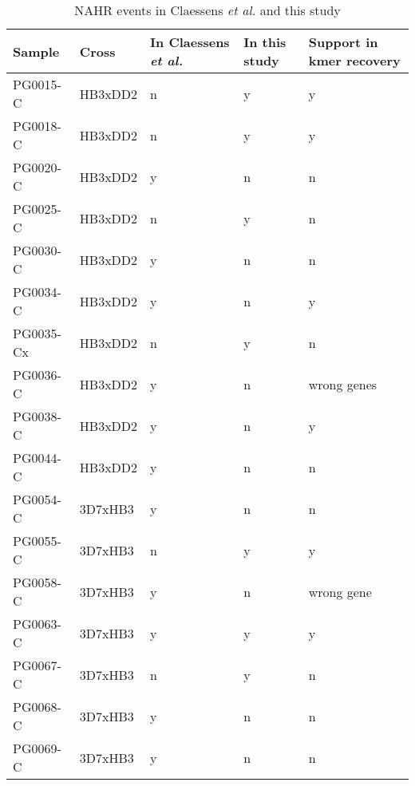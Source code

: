 \begin{table}[]
\centering
\caption{NAHR events in Claessens \textit{et al.} and this study}
\label{tbl:nahrcompare}
\begin{tabular}{@{}lllll@{}}
\toprule
Sample    & Cross   & In Claessens \textit{et al.} & In this study & Support in kmer recovery \\ \midrule
PG0015-C  & HB3xDD2 & n                            & y             & y                        \\
PG0018-C  & HB3xDD2 & n                            & y             & y                        \\
PG0020-C  & HB3xDD2 & y                            & n             & n                        \\
PG0025-C  & HB3xDD2 & n                            & y             & n                        \\
PG0030-C  & HB3xDD2 & y                            & n             & n                        \\
PG0034-C  & HB3xDD2 & y                            & n             & y                        \\
PG0035-Cx & HB3xDD2 & n                            & y             & n                        \\
PG0036-C  & HB3xDD2 & y                            & n             & wrong genes              \\
PG0038-C  & HB3xDD2 & y                            & n             & y                        \\
PG0044-C  & HB3xDD2 & y                            & n             & n                        \\
PG0054-C  & 3D7xHB3 & y                            & n             & n                        \\
PG0055-C  & 3D7xHB3 & n                            & y             & y                        \\
PG0058-C  & 3D7xHB3 & y                            & n             & wrong gene               \\
PG0063-C  & 3D7xHB3 & y                            & y             & y                        \\
PG0067-C  & 3D7xHB3 & n                            & y             & n                        \\
PG0068-C  & 3D7xHB3 & y                            & n             & n                        \\
PG0069-C  & 3D7xHB3 & y                            & n             & n                        \\

\end{tabular}
\end{table}
